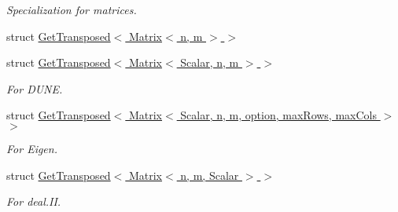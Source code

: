\begin{DoxyCompactItemize}
\begin{DoxyCompactList}\small\item\em \-Specialization for matrices. \end{DoxyCompactList}\item 
struct \hyperlink{structFunG_1_1LinearAlgebra_1_1GetTransposed_3_01Matrix_3_01n_00_01m_01_4_01_4}{\-Get\-Transposed$<$ Matrix$<$ n, m $>$ $>$}
\item 
struct \hyperlink{structFunG_1_1LinearAlgebra_1_1GetTransposed_3_01Matrix_3_01Scalar_00_01n_00_01m_01_4_01_4}{\-Get\-Transposed$<$ Matrix$<$ Scalar, n, m $>$ $>$}
\begin{DoxyCompactList}\small\item\em \-For \-D\-U\-N\-E. \end{DoxyCompactList}\item 
struct \hyperlink{structFunG_1_1LinearAlgebra_1_1GetTransposed_3_01Matrix_3_01Scalar_00_01n_00_01m_00_01option_00_837706e7e2f5ff6060578b88ee4bef60}{\-Get\-Transposed$<$ Matrix$<$ Scalar, n, m, option, max\-Rows, max\-Cols $>$ $>$}
\begin{DoxyCompactList}\small\item\em \-For \-Eigen. \end{DoxyCompactList}\item 
struct \hyperlink{structFunG_1_1LinearAlgebra_1_1GetTransposed_3_01Matrix_3_01n_00_01m_00_01Scalar_01_4_01_4}{\-Get\-Transposed$<$ Matrix$<$ n, m, Scalar $>$ $>$}
\begin{DoxyCompactList}\small\item\em \-For deal.\-I\-I. \end{DoxyCompactList}\end{DoxyCompactItemize}

